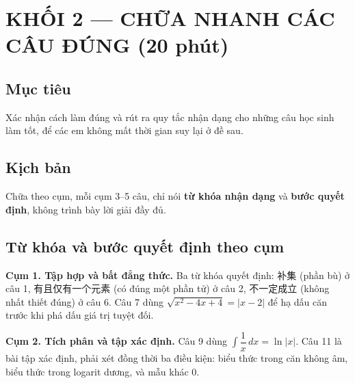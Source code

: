 \documentclass[11pt, a4paper]{article}
\begin{document}
\section{KHỐI 2 — CHỮA NHANH CÁC CÂU ĐÚNG (20 phút)}

\subsection{Mục tiêu}

Xác nhận cách làm đúng và rút ra quy tắc nhận dạng cho những câu học sinh làm tốt, để các em không mất thời gian suy lại ở đề sau.

\subsection{Kịch bản}

Chữa theo cụm, mỗi cụm 3–5 câu, chỉ nói \textbf{từ khóa nhận dạng} và \textbf{bước quyết định}, không trình bày lời giải đầy đủ.


\subsection{Từ khóa và bước quyết định theo cụm}

\textbf{Cụm 1. Tập hợp và bất đẳng thức.} Ba từ khóa quyết định: 补集 (phần bù) ở câu 1, 有且仅有一个元素 (có đúng một phần tử) ở câu 2, 不一定成立 (không nhất thiết đúng) ở câu 6. Câu 7 dùng $\sqrt{x^2-4x+4}=\lvert x-2 \rvert$ để hạ dấu căn trước khi phá dấu giá trị tuyệt đối.

\textbf{Cụm 2. Tích phân và tập xác định.} Câu 9 dùng $\displaystyle\int \dfrac{1}{x}\,dx = \ln\lvert x \rvert$. Câu 11 là bài tập xác định, phải xét đồng thời ba điều kiện: biểu thức trong căn không âm, biểu thức trong logarit dương, và mẫu khác 0.
\end{document}
